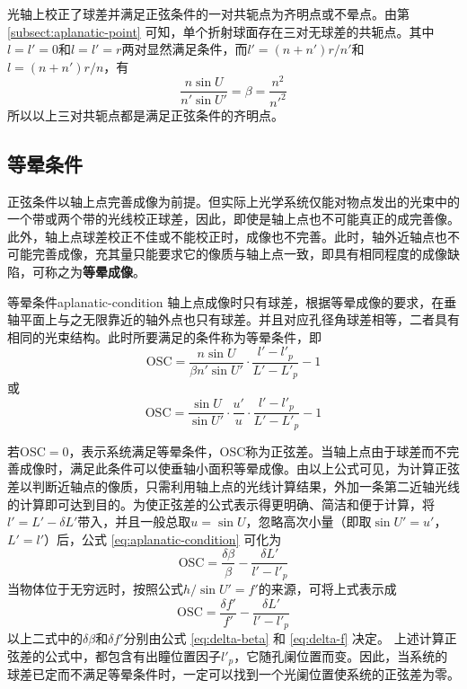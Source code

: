 \documentclass[cn,10pt,chinesefont=founder,math=mtpro2,cite=super,toc=onecol,twoside,openany]{elegantbook}
\begin{document}
光轴上校正了球差并满足正弦条件的一对共轭点为齐明点或不晕点。由第 \ref{subsect:aplanatic-point} 可知，单个折射球面存在三对无球差的共轭点。其中$l=l'=0$和$l=l'=r$两对显然满足条件，而$l'=(n+n')r/n'$和$l=(n+n')r/n$，有
\begin{equation}
\frac{n\sin U}{n'\sin U'}=\beta=\frac{n^2}{n'^2}
\end{equation}
所以以上三对共轭点都是满足正弦条件的齐明点。

\subsection{等晕条件}
正弦条件以轴上点完善成像为前提。但实际上光学系统仅能对物点发出的光束中的一个带或两个带的光线校正球差，因此，即使是轴上点也不可能真正的成完善像。此外，轴上点球差校正不佳或不能校正时，成像也不完善。此时，轴外近轴点也不可能完善成像，充其量只能要求它的像质与轴上点一致，即具有相同程度的成像缺陷，可称之为\textbf{等晕成像}。

\begin{definition}{等晕条件}{aplanatic-condition}
	轴上点成像时只有球差，根据等晕成像的要求，在垂轴平面上与之无限靠近的轴外点也只有球差。并且对应孔径角球差相等，二者具有相同的光束结构。此时所要满足的条件称为等晕条件，即
	\begin{equation}
	\mathrm{OSC}=\frac{n\sin U}{\beta n'\sin U'}\cdot\frac{l'-l'_p}{L'-L'_p}-1
	\end{equation}
	或
	\begin{equation}
	\mathrm{OSC}=\frac{\sin U}{\sin U'}\cdot\frac{u'}{u}\cdot\frac{l'-l'_p}{L'-L'_p}-1
	\label{eq:aplanatic-condition}
	\end{equation}
\end{definition}
若$\mathrm{OSC}=0$，表示系统满足等晕条件，$\mathrm{OSC}$称为正弦差。当轴上点由于球差而不完善成像时，满足此条件可以使垂轴小面积等晕成像。由以上公式可见，为计算正弦差以判断近轴点的像质，只需利用轴上点的光线计算结果，外加一条第二近轴光线的计算即可达到目的。为使正弦差的公式表示得更明确、简洁和便于计算，将$l'=L'-\delta L'$带入，并且一般总取$u=\sin U$，忽略高次小量（即取$\sin U'=u'$，$L'=l'$）后，公式 \eqref{eq:aplanatic-condition} 可化为
\begin{equation}
\mathrm{OSC}=\frac{\delta\beta}{\beta}-\frac{\delta L'}{l'-l'_p}
\end{equation}
当物体位于无穷远时，按照公式$h/\sin U'=f'$的来源，可将上式表示成
\begin{equation}
\mathrm{OSC}=\frac{\delta f'}{f'}-\frac{\delta L'}{l'-l'_p}
\end{equation}
以上二式中的$\delta\beta$和$\delta f'$分别由公式 \eqref{eq:delta-beta} 和 \eqref{eq:delta-f} 决定。
上述计算正弦差的公式中，都包含有出瞳位置因子$l'_p$，它随孔阑位置而变。因此，当系统的球差已定而不满足等晕条件时，一定可以找到一个光阑位置使系统的正弦差为零。
\end{document}
